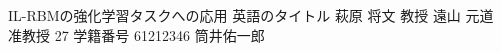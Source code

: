 \documentclass[final,a4j,12pt]{jreport}
\begin{document}
\begin{titlepage}
\thesis
{IL-RBMの強化学習タスクへの応用}
{英語のタイトル}
{萩原 将文 教授}
{遠山 元道 准教授}
{27}
{学籍番号 61212346}
{筒井佑一郎}
\end{titlepage}
\contents
{}



%
%


%

%

%


\appendix

%
%
\end{document}
